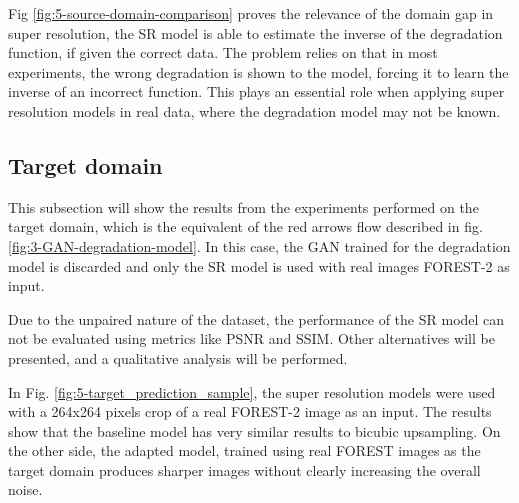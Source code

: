         Fig \ref{fig:5-source-domain-comparison} proves the relevance of the domain gap in super resolution, the SR model is able to estimate the inverse of the degradation function, if given the correct data.
        The problem relies on that in most experiments, the wrong degradation is shown to the model, forcing it to learn the inverse of an incorrect function.  
        This plays an essential role when applying super resolution models in real data, where the degradation model may not be known. 

    \subsection{Target domain}

        This subsection will show the results from the experiments performed on the target domain, which is the equivalent of the red arrows flow described in fig. \ref{fig:3-GAN-degradation-model}.
        In this case, the GAN trained for the degradation model is discarded and only the SR model is used with real images FOREST-2 as input.
        
        Due to the unpaired nature of the dataset, the performance of the SR model can not be evaluated using metrics like PSNR and SSIM. 
        Other alternatives will be presented, and a qualitative analysis will be performed. 


        In Fig. \ref{fig:5-target_prediction_sample}, the super resolution models were used with a 264x264 pixels crop of a real FOREST-2 image as an input.
        The results show that the baseline model has very similar results to bicubic upsampling.
        On the other side, the adapted model, trained using real FOREST images as the target domain produces sharper images without clearly increasing the overall noise.
        
        


